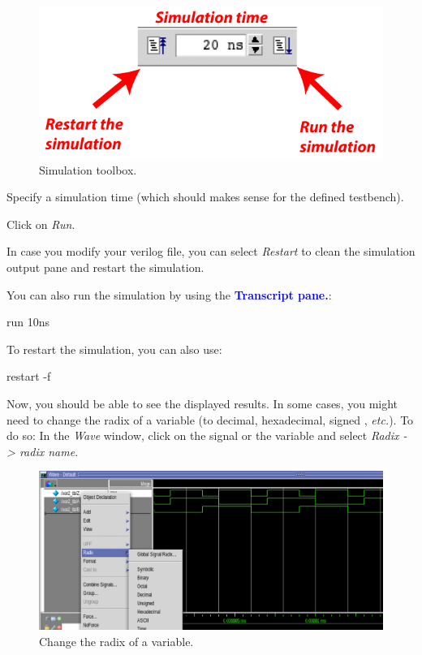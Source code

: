 \begin{enumerate}
	\parbox[t]{\dimexpr\textwidth-\leftmargin}{%
		\begin{figure}
			\vspace{0mm}
			\centering
			\vspace{-\baselineskip}
			\includegraphics[scale=0.5]{figures/modelsim/runsim.pdf}
			\caption{Simulation toolbox.}
			\label{compile}
		\end{figure}
		\item Specify a simulation time (which should makes sense for the defined testbench).
		\item Click on \textit{Run}.
		\item In case you modify your verilog file, you can select \textit{Restart} to clean the simulation output pane and restart the simulation.
	}

\end{enumerate}
	You can also run the simulation by using the \textbf{\textcolor{blue}{Transcript pane.}}:
\begin{codeline}
	run 10ns
\end{codeline}
	To restart the simulation, you can also use:
\begin{codeline}
	restart -f
\end{codeline}

Now, you should be able to see the displayed results. In some cases, you might need to change the radix of a variable (to decimal, hexadecimal, signed , \textit{etc.}). To do so: In the \textit{Wave} window, click on the signal or the variable and select \textit{Radix -> radix name}.

\begin{figure}[!h]
	\centering
	\includegraphics[scale=0.4]{figures/modelsim/radix}
	\caption{Change the radix of a variable.}
	\label{outputwave}
\end{figure}

